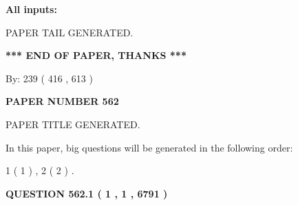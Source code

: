 \documentclass[12pt]{article}
\begin{document}
   
   
   
\noindent{}
   
   
   
   
\noindent\vspace{0.1in}\hspace{-0.08in} {\textbf{\Large{All inputs: }}}
   
   
   
   
   
   
 \vspace{0.2in}
 
   
   
\vspace{2.0in} PAPER TAIL GENERATED.
   
   
   
   
\vspace{1.0in} 
{\textbf{\large{ *** END OF PAPER, THANKS *** }}} 
   
   
\hspace{1.0in} By: 
 239 ( 416 ,  613 )
   
   
   
   
\newpage 
\setcounter{page}{ 
   562001 } 
   
   
   
   
 {\textbf{ \Large{ PAPER NUMBER  562  }}}
   
   
\vspace{0.2in}
   
   
   
   
   
   
   
   
 \vspace{0.2in}
 
 
 
 
   
   
 PAPER TITLE GENERATED.
   
   
   
\vspace{0.2in}
   
In this paper, big questions will be generated in the following order: 
   
   
   1 ( 1 )
 ,
   2 ( 2 )
 .
  
\vspace{0.2in}
  
{\textbf{\Large{QUESTION
562.1 
 ( 1 , 1 , 6791 )
}}}
  
\end{document}
